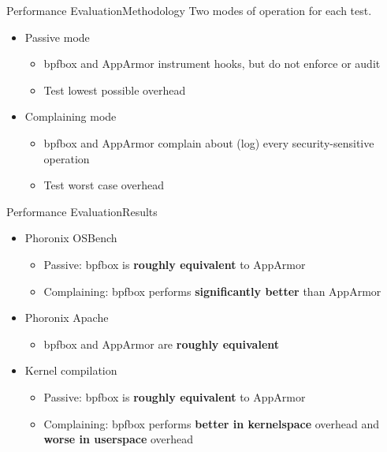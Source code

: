 \documentclass[12pt, dvipsnames, aspectratio=169]{beamer}
\begin{document}
\begin{frame}[c]{Performance Evaluation}{Methodology}
Two modes of operation for each test.
\vfill
\begin{itemize}
    \item Passive mode
    \begin{itemize}
        \item bpfbox and AppArmor instrument hooks, but do not enforce or audit
        \item Test lowest possible overhead
    \end{itemize}
    \vfill
    \item Complaining mode
    \begin{itemize}
        \item bpfbox and AppArmor complain about (log) every security-sensitive operation
        \item Test worst case overhead
    \end{itemize}
\end{itemize}
\end{frame}

\begin{frame}[c]{Performance Evaluation}{Results}
\begin{itemize}
    \item Phoronix OSBench
    \begin{itemize}
        \item Passive: bpfbox is \textbf{roughly equivalent} to AppArmor
        \item Complaining: bpfbox performs \textbf{significantly better} than AppArmor
    \end{itemize}

    \vfill
    \item Phoronix Apache
    \begin{itemize}
        \item bpfbox and AppArmor are \textbf{roughly equivalent}
    \end{itemize}

    \vfill
    \item Kernel compilation
    \begin{itemize}
        \item Passive: bpfbox is \textbf{roughly equivalent} to AppArmor
        \item Complaining: bpfbox performs \textbf{better in kernelspace} overhead and \textbf{worse in userspace} overhead
    \end{itemize}
\end{itemize}
\end{frame}
\end{document}
